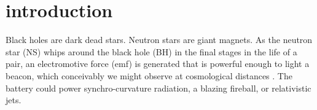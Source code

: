   





\section{introduction}
Black holes are dark dead stars. Neutron stars are giant magnets. As
the neutron star (NS) whips around the black hole (BH) in the final
stages in the life of a pair, an electromotive force (emf) is
generated that is powerful enough to light a beacon, which conceivably we
might observe at cosmological distances
\citep{McL:2011,DorazioLevin:2013}. The battery could power
synchro-curvature radiation, a blazing fireball, or relativistic jets.


